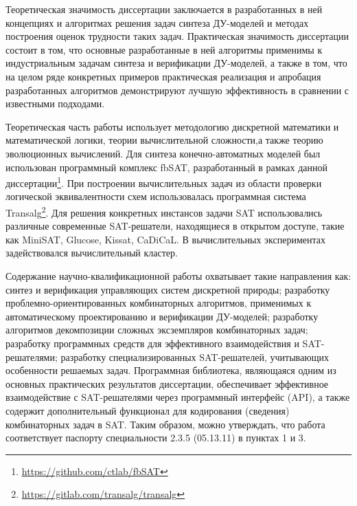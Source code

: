 \influence
Теоретическая значимость диссертации заключается в разработанных в ней концепциях и алгоритмах решения задач синтеза ДУ-моделей и методах построения оценок трудности таких задач.
Практическая значимость диссертации состоит в том, что основные разработанные в ней алгоритмы применимы к индустриальным задачам синтеза и верификации ДУ-моделей, а также в том, что на целом ряде конкретных примеров практическая реализация и апробация разработанных  алгоритмов демонстрируют лучшую эффективность в сравнении с известными подходами.


\methods
Теоретическая часть работы использует методологию дискретной математики и математической логики, теории вычислительной сложности,а также теорию эволюционных вычислений.
Для синтеза конечно-автоматных моделей был использован программный комплекс fbSAT, разработанный в рамках данной диссертации\footnote{\url{https://github.com/ctlab/fbSAT}}.
При построении вычислительных задач из области проверки логической эквивалентности схем использовалась программная система Transalg\footnote{\url{https://gitlab.com/transalg/transalg}}.
Для решения конкретных инстансов задачи SAT использовались различные современные SAT-решатели, находящиеся в открытом доступе, такие как MiniSAT, Glucose, Kissat, CaDiCaL.
В вычислительных экспериментах задействовался вычислительный кластер.


\relevance
Содержание научно-квалификационной работы охватывает такие направления как: синтез и верификация управляющих систем дискретной природы; разработку проблемно-ориентированных комбинаторных алгоритмов, применимых к автоматическому проектированию и верификации ДУ-моделей; разработку алгоритмов декомпозиции сложных эксземпляров комбинаторных задач; разработку программных средств для эффективного взаимодействия и SAT-решателями; разработку специализированных SAT-решателей, учитывающих особенности решаемых задач.
Программная библиотека, являющаяся одним из основных практических результатов диссертации, обеспечивает эффективное взаимодействие с SAT-решателями через программный интерфейс (API), а также содержит дополнительный функционал для кодирования (сведения) комбинаторных задач в SAT.
Таким образом, можно утверждать, что работа соответствует паспорту специальности 2.3.5 (05.13.11) в пунктах 1 и 3.


\reliability
\todo{}


